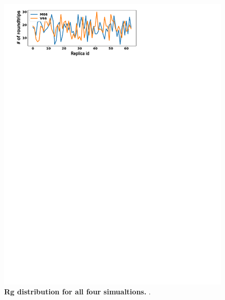 \documentclass[journal=jacsat,manuscript=article]{achemso}
\begin{document}
\begin{figure}[!ht]
 \includegraphics[scale=0.5,width=\textwidth,trim={0 0cm 0 0},clip]{../figures/S7.pdf}
\caption{{\bf Rg distribution for all four simualtions.}
.
 }
\label{S7} 
\end{figure}
\end{document}
